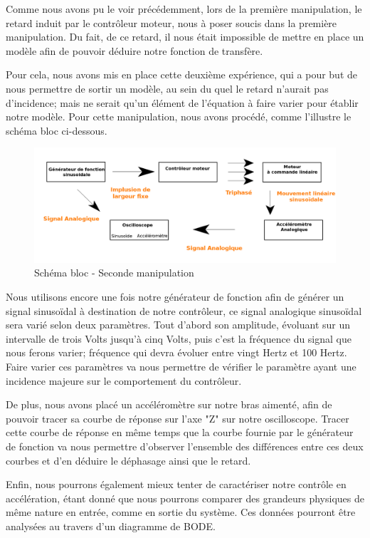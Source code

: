 \documentclass[french,a4paper,12pt]{report}
\begin{document}
		Comme nous avons pu le voir précédemment, lors de la première manipulation, le retard induit par le contrôleur moteur, nous à poser soucis dans la première manipulation. Du fait, de ce retard, il nous était impossible de mettre en place un modèle afin de pouvoir déduire notre fonction de transfère.
		
		Pour cela, nous avons mis en place cette deuxième expérience, qui a pour but de nous permettre de sortir un modèle, au sein du quel le retard n'aurait pas d'incidence; mais ne serait qu'un élément de l'équation à faire varier pour établir notre modèle. Pour cette manipulation, nous avons procédé, comme l'illustre le schéma bloc ci-dessous.		
		
	\begin{figure}[!ht]
    \center
  	\includegraphics[width=18cm]{manip2.png}
    \caption{Schéma bloc - Seconde manipulation}
	\end{figure}	
	
	Nous utilisons encore une fois notre générateur de fonction afin de générer un signal sinusoïdal à destination de notre contrôleur, ce signal analogique sinusoïdal sera varié selon deux paramètres. Tout d'abord son amplitude, évoluant sur un intervalle de trois Volts jusqu'à cinq Volts, puis c'est la fréquence du signal que nous ferons varier; fréquence qui devra évoluer entre vingt Hertz et 100 Hertz.	Faire varier ces paramètres va nous permettre de vérifier le paramètre ayant une incidence majeure sur le comportement du contrôleur.
	
	De plus, nous avons placé un accéléromètre sur notre bras aimenté, afin de pouvoir tracer sa courbe de réponse sur l'axe "Z" sur notre oscilloscope. Tracer cette courbe de réponse en même temps que la courbe fournie par le générateur de fonction va nous permettre d'observer l'ensemble des différences entre ces deux courbes et d'en déduire le déphasage ainsi que le retard.
	
	Enfin, nous pourrons également mieux tenter de caractériser notre contrôle en accélération, étant donné que nous pourrons comparer des grandeurs physiques de même nature en entrée, comme en sortie du système. Ces données pourront être analysées au travers d'un diagramme de BODE.
	
\end{document}
